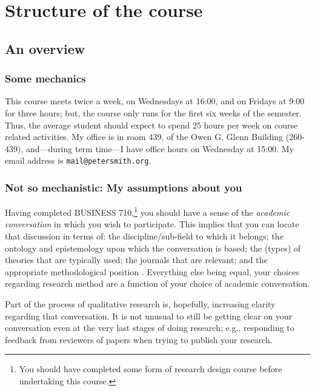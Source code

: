 \documentclass[]{book}
\let\rmarkdownfootnote\footnote%
\def\footnote{\protect\rmarkdownfootnote}
\theoremstyle{definition}
\theoremstyle{definition}
\theoremstyle{definition}
\theoremstyle{remark}
\begin{document}
\hypertarget{course-structure}{%
\chapter{Structure of the course}\label{course-structure}}

\hypertarget{course-overview}{%
\section{An overview}\label{course-overview}}

\hypertarget{some-mechanics}{%
\subsection{Some mechanics}\label{some-mechanics}}

This course meets twice a week, on Wednesdays at 16:00, and on Fridays
at 9:00 for three hours; but, the course only runs for the first six
weeks of the semester. Thus, the average student should expect to spend
25 hours per week on course related activities. My office is in room
439, of the Owen G. Glenn Building (260-439), and---during term time---I
have office hours on Wednesday at 15:00. My email address is
\texttt{mail@petersmith.org}.

\hypertarget{not-so-mechanistic-my-assumptions-about-you}{%
\subsection{Not so mechanistic: My assumptions about
you}\label{not-so-mechanistic-my-assumptions-about-you}}

Having completed BUSINESS 710,\footnote{You should have completed some
  form of research design course before undertaking this course.} you
should have a sense of the \emph{academic conversation} in which you
wish to participate. This implies that you can locate that discussion in
terms of: the discipline/sub-field to which it belongs; the ontology and
epistemology upon which the conversation is based; the (types) of
theories that are typically used; the journals that are relevant; and
the appropriate methodological position \autocite[
p.~7]{huff_2009_designingresearchpublication}. Everything else being
equal, your choices regarding research method are a function of your
choice of academic conversation.

Part of the process of qualitative research is, hopefully, increasing
clarity regarding that conversation. It is not unusual to still be
getting clear on your conversation even at the very last stages of doing
research; e.g., responding to feedback from reviewers of papers when
trying to publish your research.
\end{document}
